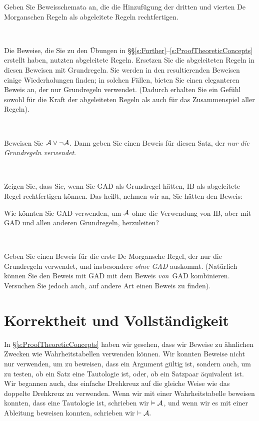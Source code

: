 \practiceproblems

\problempart
Geben Sie Beweisschemata an, die die Hinzufügung der dritten und vierten De Morganschen Regeln als abgeleitete Regeln rechtfertigen. 

\

\problempart
Die Beweise, die Sie zu den Übungen in \S\S\ref{s:Further}--\ref{s:ProofTheoreticConcepts} erstellt haben, nutzten abgeleitete Regeln. Ersetzen Sie die abgeleiteten Regeln in diesen Beweisen mit Grundregeln. Sie werden in den resultierenden Beweisen einige Wiederholungen finden; in solchen Fällen, bieten Sie einen eleganteren Beweis an, der nur Grundregeln verwendet. (Dadurch erhalten Sie ein Gefühl sowohl für die Kraft der abgeleiteten Regeln als auch für das Zusammenspiel aller Regeln).

\

\problempart
Beweisen Sie $\mathcal{A} \vee \neg\mathcal{A}$. Dann geben Sie einen Beweis für diesen Satz, der \emph{nur die Grundregeln verwendet}.

\

\problempart
Zeigen Sie, dass Sie, wenn Sie GAD als Grundregel hätten, IB als abgeleitete Regel rechtfertigen können. Das hei{\ss}t, nehmen wir an, Sie hätten den Beweis:
\begin{fitchproof}
  \open
  \close
\end{fitchproof}
Wie könnten Sie GAD verwenden, um $\mathcal{A}$ ohne die Verwendung von IB, aber mit GAD und allen anderen Grundregeln, herzuleiten?

\

\problempart
Geben Sie einen Beweis für die erste De Morgansche Regel, der nur die Grundregeln verwendet, und insbesondere \emph{ohne GAD} auskommt. (Natürlich können Sie den Beweis mit GAD mit dem Beweis \emph{von}~GAD kombinieren. Versuchen Sie jedoch auch, auf andere Art einen Beweis zu finden).

\chapter{Korrektheit und Vollständigkeit}
\label{sec:soundness_and_completeness}

In \S\ref{s:ProofTheoreticConcepts} haben wir gesehen, dass wir Beweise zu ähnlichen Zwecken wie Wahrheitstabellen verwenden können. Wir konnten Beweise nicht nur verwenden, um zu beweisen, dass ein Argument gültig ist, sondern auch, um zu testen, ob ein Satz eine Tautologie ist, oder, ob ein Satzpaar äquivalent ist. Wir begannen auch, das einfache Drehkreuz auf die gleiche Weise wie das doppelte Drehkreuz zu verwenden. Wenn wir mit einer Wahrheitstabelle beweisen konnten, dass  eine Tautologie ist, schrieben wir $\vDash \mathcal{A}$, und wenn wir es mit einer Ableitung beweisen konnten, schrieben wir $\vdash \mathcal{A}.$ 

